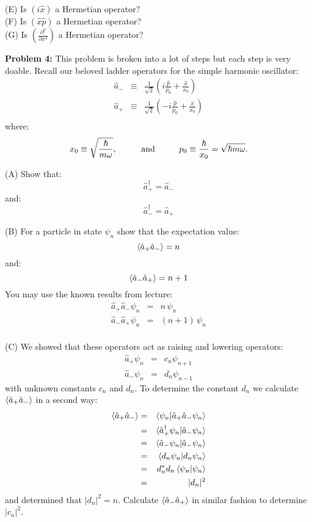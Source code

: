 \documentclass[12pt]{article}
\begin{document}
\noindent
(E) Is $\left(i\hat{x}\right)$ a Hermetian operator?\\[5pt]

\noindent
(F) Is $\left(\hat{x}\hat{p}\right)$ a Hermetian operator?\\[5pt]

\noindent
(G) Is $\left(\frac{\partial^2}{\partial x^2}\right)$ a Hermetian operator?\\[5pt]

\newpage

\noindent
{\bf Problem 4:}  This problem is broken into a lot of steps but each step is very doable.  Recall our beloved ladder operators for the simple harmonic oscillator:
\begin{eqnarray*}
\hat{a}_- &\equiv& \frac{1}{\sqrt{2}}\left(i \frac{\hat{p}}{p_0} + \frac{\hat{x}}{x_0}\right) \\
\hat{a}_+ &\equiv& \frac{1}{\sqrt{2}}\left(-i \frac{\hat{p}}{p_0} + \frac{\hat{x}}{x_0} \right) \\
\end{eqnarray*}
where:
$$x_0 \equiv \sqrt{\frac{\hbar}{m \omega}}, \hspace{1cm} {\rm and} \hspace{1cm} p_0 \equiv \frac{\hbar}{x_0} = \sqrt{\hbar m \omega}.$$

\noindent
(A) Show that:
$$\hat{a}_+^\dagger = \hat{a}_-$$
and:
$$\hat{a}_-^\dagger = \hat{a}_+$$

\noindent
(B) For a particle in state $\psi_n$ show that the expectation value:
$$\braket{\hat{a}_+\hat{a}_-} = n $$
and:
$$\braket{\hat{a}_-\hat{a}_+} = n+1$$
You may use the known results from lecture:
\begin{eqnarray*}
\hat{a}_+\hat{a}_- \psi_n &=& n \, \psi_{n} \\
\hat{a}_-\hat{a}_+ \psi_n &=& (n+1) \, \psi_{n} \\
\end{eqnarray*}

\noindent
(C) We showed that these operators act as raising and lowering operators:
\begin{eqnarray*}
\hat{a}_+ \psi_n &=& c_n \psi_{n+1} \\
\hat{a}_- \psi_n &=& d_n \psi_{n-1} 
\end{eqnarray*}
with unknown constants $c_n$ and $d_n$.  To determine the constant $d_n$ we calculate $\braket{\hat{a}_+\hat{a}_-}$ in a second way:
\begin{eqnarray*}
\braket{\hat{a}_+\hat{a}_-} &=& \braket{\psi_n | \hat{a}_+ \hat{a}_- \psi_n}\\
 &=& \braket{\hat{a}_+^\dagger \psi_n | \hat{a}_- \psi_n}\\
 &=& \braket{\hat{a}_- \psi_n | \hat{a}_- \psi_n}\\
 &=& \braket{d_n \psi_n | d_n \psi_n}\\
 &=& d_n^* d_n \braket{\psi_n | \psi_n}\\
 &=& |d_n|^2\\ 
\end{eqnarray*}
and determined that $|d_n|^2 = n$.  Calculate 
$\braket{\hat{a}_-\hat{a}_+}$ in similar fashion to determine $|c_n|^2$.\\[5pt]
\end{document}
